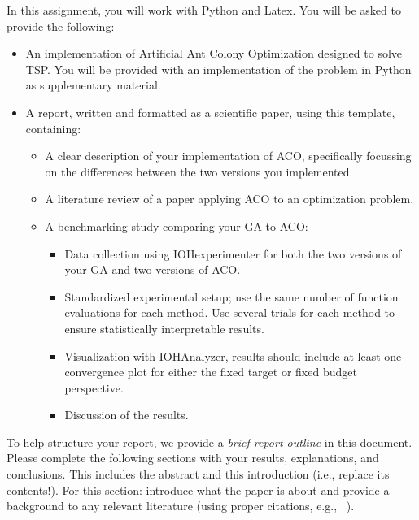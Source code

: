 \documentclass[runningheads]{llncs}
\begin{document}
In this assignment, you will work with Python and Latex. You will be asked to provide the following:
\begin{itemize}
   \item An implementation of Artificial Ant Colony Optimization designed to solve TSP. You will be provided with an implementation of the problem in Python as supplementary material. 
   \item A report, written and formatted as a scientific paper, using this template, containing:
\begin{itemize}
    \item A clear description of your implementation of ACO, specifically focussing on the differences between the two versions you implemented. 
    \item A literature review of a paper applying ACO to an optimization problem.
    \item A benchmarking study comparing your GA to ACO:
    \begin{itemize}
        \item Data collection using IOHexperimenter for both the two versions of your GA and two versions of ACO. 
        \item Standardized experimental setup; use the same number of function evaluations for each method. Use several trials for each method to ensure statistically interpretable results.
        \item Visualization with IOHAnalyzer, results should include at least one convergence plot for either the fixed target or fixed budget perspective. 
        \item Discussion of the results.
    \end{itemize}
\end{itemize}
\end{itemize}

To help structure your report, we provide a \textit{brief report outline} in this document. Please complete the following sections with your results, explanations, and conclusions. This includes the abstract and this introduction (i.e., replace its contents!). For this section: introduce what the paper is about and provide a background to any relevant literature (using proper citations, e.g., ~\cite{holland1992genetic}).
\end{document}
